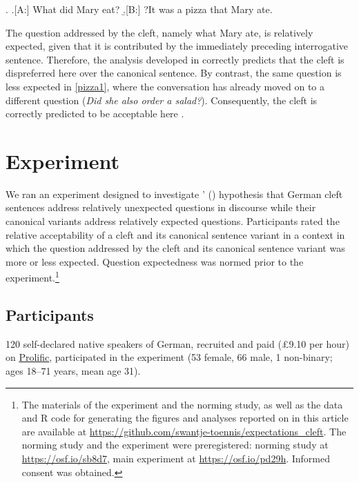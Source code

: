 \documentclass{salt}
\begin{document}
\ex.\label{pizza2}
\a.[A:] What did Mary eat?
\b.[B:] ?It was a pizza that Mary ate. \hfill \cite[449]{velleman_et_al_2012}

The question addressed by the cleft, namely what Mary ate, is relatively expected, given that it is contributed by the immediately preceding interrogative sentence. Therefore, the analysis developed in \cite{tonnis_2021} correctly predicts that the cleft is dispreferred here over the canonical sentence. By contrast, the same question is less expected in \ref{pizza1}, where the conversation has already moved on to a different question (\textit{Did she also order a salad?}). Consequently, the cleft is correctly predicted to be acceptable here \cite[for a more detailed discussion see][133--141]{tonnis_2022}.



\section{Experiment}
\label{sec:exp}

We ran an experiment designed to investigate \citeauthor{tonnis_2021}' (\citeyear{tonnis_2021}) hypothesis that German cleft sentences address relatively unexpected questions in discourse while their canonical variants address relatively expected questions. Participants rated the relative acceptability of a cleft and its canonical sentence variant in a context in which the question addressed by the cleft and its canonical sentence variant was more or less expected. Question expectedness was normed prior to the experiment.\footnote{\label{github}The materials of the experiment and the norming study, as well as the data and R code for generating the figures and analyses reported on in this article are available at \url{https://github.com/swantje-toennis/expectations_cleft}. The norming study and the experiment were preregistered: norming study at \url{https://osf.io/sb8d7}, main experiment at \url{https://osf.io/pd29h}. Informed consent was obtained.}



\subsection{Participants} 120 self-declared native speakers of German, recruited and paid (\pounds9.10 per hour) on \href{https://www.prolific.co/}{Prolific}, participated in the experiment (53 female, 66 male, 1 non-binary; ages 18--71 years, mean age 31).
\end{document}
